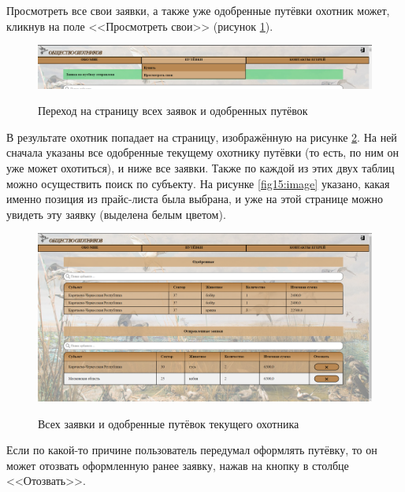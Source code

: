 	Просмотреть все свои заявки, а также уже одобренные путёвки охотник может, кликнув на поле <<Просмотреть свои>> (рисунок \ref{fig17:image}).
	
	\begin{figure}[h]
		\centering
		\begin{center}
			{\includegraphics[scale=0.34]{schemes/screens/to_have.png}}
			\caption{Переход на страницу всех заявок и одобренных путёвок}
			\label{fig17:image}
		\end{center}
	\end{figure}

	В результате охотник попадает на страницу, изображённую на рисунке \ref{fig18:image}. На ней сначала указаны все одобренные текущему охотнику путёвки (то есть, по ним он уже может охотиться), и ниже все заявки. Также по каждой из этих двух таблиц можно осуществить поиск по субъекту. На рисунке \ref{fig15:image} указано, какая именно позиция из прайс-листа была выбрана, и уже на этой странице можно увидеть эту заявку (выделена белым цветом).
	
	\begin{figure}[h]
		\centering
		\begin{center}
			{\includegraphics[scale=0.34]{schemes/screens/all_vouchers.png}}
			\caption{Всех заявки и одобренные путёвок текущего охотника}
			\label{fig18:image}
		\end{center}
	\end{figure}

	Если по какой-то причине пользователь передумал оформлять путёвку, то он может отозвать оформленную ранее заявку, нажав на кнопку в столбце <<Отозвать>>. 
	
